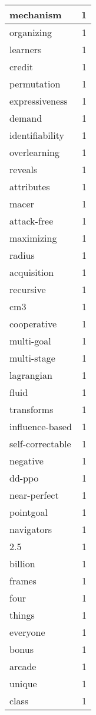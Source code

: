 \begin{table}[h]
\begin{tabular}{|l|r|}
\hline
mechanism & 1 \\
\hline
organizing & 1 \\
\hline
learners & 1 \\
\hline
credit & 1 \\
\hline
permutation & 1 \\
\hline
expressiveness & 1 \\
\hline
demand & 1 \\
\hline
identifiability & 1 \\
\hline
overlearning & 1 \\
\hline
reveals & 1 \\
\hline
attributes & 1 \\
\hline
macer & 1 \\
\hline
attack-free & 1 \\
\hline
maximizing & 1 \\
\hline
radius & 1 \\
\hline
acquisition & 1 \\
\hline
recursive & 1 \\
\hline
cm3 & 1 \\
\hline
cooperative & 1 \\
\hline
multi-goal & 1 \\
\hline
multi-stage & 1 \\
\hline
lagrangian & 1 \\
\hline
fluid & 1 \\
\hline
transforms & 1 \\
\hline
influence-based & 1 \\
\hline
self-correctable & 1 \\
\hline
negative & 1 \\
\hline
dd-ppo & 1 \\
\hline
near-perfect & 1 \\
\hline
pointgoal & 1 \\
\hline
navigators & 1 \\
\hline
2.5 & 1 \\
\hline
billion & 1 \\
\hline
frames & 1 \\
\hline
four & 1 \\
\hline
things & 1 \\
\hline
everyone & 1 \\
\hline
bonus & 1 \\
\hline
arcade & 1 \\
\hline
unique & 1 \\
\hline
class & 1 \\

\end{tabular}
\end{table}
